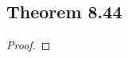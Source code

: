 \documentclass[../../main.tex]{subfiles}
\begin{document}
\subsection{Theorem 8.44}
\begin{wts}

\end{wts}
\begin{proof}

\end{proof}
\end{document}
